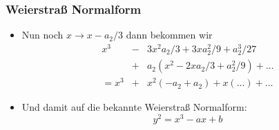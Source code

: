 \documentclass{beamer}
\begin{document}
\begin{frame}
  \frametitle{Weierstraß Normalform}
  \begin{itemize}
  \item Nun noch $x \to x - a_2 / 3$ dann bekommen wir
    \begin{eqnarray*}
      x^3 & - & 3x^2 a_2/3 + 3x a_2^2 / 9 + a_2^3 / 27 \\
          & + & a_2 (x^2 - 2 x a_2 / 3 + a_2^2 / 9) + \dots \\
      = x^3 & + & x^2 (-a_2 + a_2) + x (\dots) + \dots
    \end{eqnarray*}
  \item Und damit auf die bekannte Weierstraß Normalform:
    $$ y^2 = x^3 - a x + b $$
  \end{itemize}
\end{frame}
\end{document}
